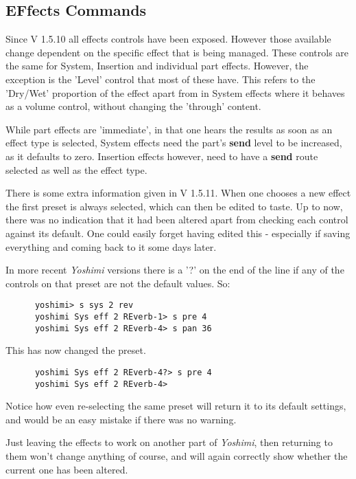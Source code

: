 \subsection{EFfects Commands}
\label{subsec:command_line_effects}
   Since V 1.5.10 all effects controls have been exposed. However those
   available change dependent on the specific effect that is being managed.
   These controls are the same for System, Insertion and individual part
   effects. However, the exception is the 'Level' control that most of these
   have. This refers to the 'Dry/Wet' proportion of the effect apart from in
   System effects where it behaves as a volume control, without changing the
   'through' content.

   While part effects are 'immediate', in that one hears the results as soon
   as an effect type is selected, System effects need the part's
   \textbf{send} level to be increased, as it defaults to zero. Insertion
   effects however, need to have a \textbf{send} route selected as well as
   the effect type.

   There is some extra information given in V 1.5.11.
   When one chooses a new effect the first preset is always selected, which
   can then be edited to taste. Up to now, there was no indication that it
   had been altered apart from checking each control against its default. One
   could easily forget having edited this - especially if saving everything
   and coming back to it some days later.

\pagebreak
   In more recent \textsl{Yoshimi} versions there is a '?' on the end of the
   line if any of the controls on that preset are not the default values.
   So:
   \begin{verbatim}
      yoshimi> s sys 2 rev
      yoshimi Sys eff 2 REverb-1> s pre 4
      yoshimi Sys eff 2 REverb-4> s pan 36
   \end{verbatim}
   This has now changed the preset.
   \begin{verbatim}
      yoshimi Sys eff 2 REverb-4?> s pre 4
      yoshimi Sys eff 2 REverb-4>
   \end{verbatim}
   Notice how even re-selecting the same preset will return it to its default
   settings, and would be an easy mistake if there was no warning.

   Just leaving the effects to work on another part of \textsl{Yoshimi}, then
   returning to them won't change anything of course, and will again
   correctly show whether the current one has been altered.

